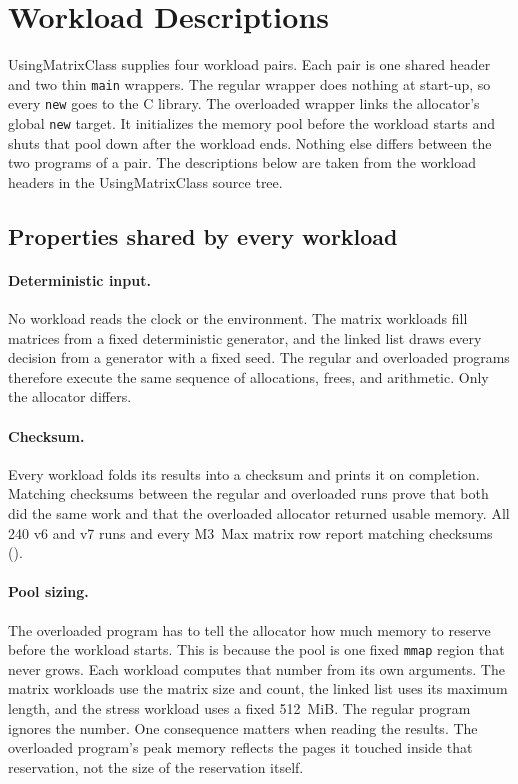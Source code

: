 \section{Workload Descriptions}
\label{sec:workloads}

UsingMatrixClass supplies four workload pairs.
Each pair is one shared header and two thin \texttt{main} wrappers.
The regular wrapper does nothing at start-up, so every \texttt{new} goes to
the C library.
The overloaded wrapper links the allocator's global \texttt{new} target.
It initializes the memory pool before the workload starts and shuts that pool
down after the workload ends.
Nothing else differs between the two programs of a pair.
The descriptions below are taken from the workload headers in the
UsingMatrixClass source tree.

\subsection{Properties shared by every workload}

\paragraph{Deterministic input.}
No workload reads the clock or the environment.
The matrix workloads fill matrices from a fixed deterministic generator, and
the linked list draws every decision from a generator with a fixed seed.
The regular and overloaded programs therefore execute the same sequence of
allocations, frees, and arithmetic.
Only the allocator differs.

\paragraph{Checksum.}
Every workload folds its results into a checksum and prints it on completion.
Matching checksums between the regular and overloaded runs prove that both did
the same work and that the overloaded allocator returned usable memory.
All 240 v6 and v7 runs and every M3~Max matrix row report matching checksums
().

\paragraph{Pool sizing.}
The overloaded program has to tell the allocator how much memory to reserve
before the workload starts.
This is because the pool is one fixed \texttt{mmap} region that never grows.
Each workload computes that number from its own arguments.
The matrix workloads use the matrix size and count, the linked list uses its
maximum length, and the stress workload uses a fixed 512~MiB.
The regular program ignores the number.
One consequence matters when reading the results.
The overloaded program's peak memory reflects the pages it touched
inside that reservation, not the size of the reservation itself.

